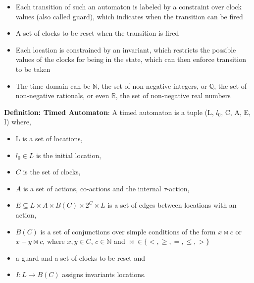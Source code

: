 \documentclass[letterpaper]{article}
\begin{document}
\begin{itemize}
	\item Each transition of such an automaton is labeled by a constraint over clock values (also called guard), which indicates when the transition can be fired
	\item A set of clocks to be reset when the transition is fired
	\item Each location is constrained by an invariant, which restricts the possible values of the clocks for being in the state, which can then enforce transition to be taken
	\item The time domain can be $\mathbb{N}$, the set of non-negative integers, or $\mathbb{Q}$, the set of non-negative rationals, or even $\mathbb{R}$, the set of non-negative real numbers
\end{itemize}
 
\textbf{Definition: Timed Automaton}: A timed automaton is a tuple (L, $l_0$, C, A, E, I) where,
\begin{itemize}
	\item L is a set of locations,
	\item $l_0 \in L$ is the initial location,
	\item $C$ is the set of clocks,
	\item $A$ is a set of actions, co-actions and the internal $\tau$-action,
	\item $E \subseteq L \times A \times B(C) \times 2^{C} \times L$ is a set of edges between locations with an action,
	\item $B(C)$ is a set of conjunctions over simple conditions of the form $x \bowtie c$ or $x - y \bowtie c$, where $x,y \in C$, $c \in \mathbb{N}$ and $\bowtie \in \{<, \geq, =, \leq, >\}$
	\item a guard and a set of clocks to be reset and
	\item $I : L \rightarrow B(C) $ assigns invariants locations.
\end{itemize}
\end{document}
